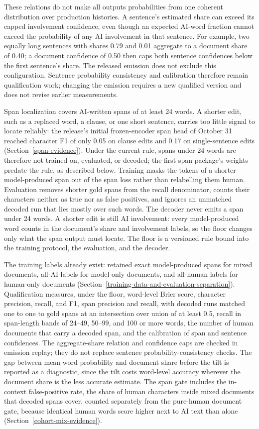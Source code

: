 These relations do not make all outputs probabilities from one coherent
distribution over production histories. A sentence's estimated share can exceed
its capped involvement confidence, even though an expected AI-word fraction
cannot exceed the probability of any AI involvement in that sentence. For
example, two equally long sentences with shares 0.79 and 0.01 aggregate to a
document share of 0.40; a document confidence of 0.50 then caps both sentence
confidences below the first sentence's share. The released emission does not
exclude this configuration. Sentence probability consistency and calibration
therefore remain qualification work; changing the emission requires a new
qualified version and does not revise earlier measurements.

Span localization covers AI-written spans of at least 24 words. A shorter
edit, such as a replaced word, a clause, or one short sentence, carries too
little signal to locate reliably: the release's initial frozen-encoder span
head of October 31 reached character F1 of
only 0.05 on clause edits and 0.17 on single-sentence edits
(Section~\ref{span-evidence}). Under the current rule, spans under 24 words
are therefore not trained on, evaluated, or decoded; the first span package's
weights predate the rule, as described below. Training masks the tokens of a shorter
model-produced span out of the span loss rather than relabelling them human.
Evaluation removes shorter gold spans from the recall denominator, counts their
characters neither as true nor as false positives, and ignores an unmatched
decoded run that lies mostly over such words. The decoder never emits a span
under 24 words. A shorter edit is still AI involvement: every model-produced
word counts in the document's share and involvement labels, so the floor
changes only what the span output must locate. The floor is a versioned rule
bound into the training protocol, the evaluation, and the decoder.

The training labels already exist: retained exact model-produced spans for mixed
documents, all-AI labels for model-only documents, and all-human labels for
human-only documents (Section~\ref{training-data-and-evaluation-separation}).
Qualification measures, under the floor, word-level Brier score, character
precision, recall, and F1, span precision and recall, with decoded runs matched
one to one to gold spans at an intersection over union of at least 0.5, recall
in span-length bands of 24--49, 50--99, and 100 or more words, the number of
human documents that carry a decoded span, and the calibration of span and
sentence confidences. The aggregate-share relation and confidence caps are
checked in emission replay; they do not replace sentence probability-consistency
checks. The gap between mean
word probability and document share before the tilt is reported as a
diagnostic, since the tilt costs word-level accuracy wherever the document
share is the less accurate estimate. The span gate includes the in-context
false-positive rate, the share of human characters inside mixed documents that
decoded spans cover, counted separately from the pure-human document gate,
because identical human words score higher next to AI text than alone
(Section~\ref{cohort-mix-evidence}).


